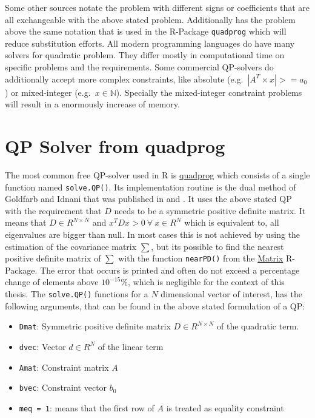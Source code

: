\documentclass[
  oneside]{book}
\providecommand{\tightlist}{%
  \setlength{\itemsep}{0pt}\setlength{\parskip}{0pt}}
\begin{document}
Some other sources notate the problem with different signs or coefficients that are all exchangeable with the above stated problem. Additionally has the problem above the same notation that is used in the R-Package \texttt{quadprog} which will reduce substitution efforts. All modern programming languages do have many solvers for quadratic problem. They differ mostly in computational time on specific problems and the requirements. Some commercial QP-solvers do additionally accept more complex constraints, like absolute (e.g.~\(|A^T \times x| >= a_0\)) or mixed-integer (e.g.~\(x \in \mathbb{N}\)). Specially the mixed-integer constraint problems will result in a enormously increase of memory.

\hypertarget{qp-solver-from-quadprog}{%
\section{QP Solver from quadprog}\label{qp-solver-from-quadprog}}

The most common free QP-solver used in R is \href{https://cran.r-project.org/web/packages/quadprog/quadprog.pdf}{quadprog} which consists of a single function named \texttt{solve.QP()}. Its implementation routine is the dual method of Goldfarb and Idnani that was published in \citep{GoId1982} and \citep{GoId1983}. It uses the above stated QP with the requirement that \(D\) needs to be a symmetric positive definite matrix. It means that \(D\in R^{N \times N}\) and \(x^T D x > 0 \ \forall \ x \in R^N\) which is equivalent to, all eigenvalues are bigger than null. In most cases this is not achieved by using the estimation of the covariance matrix \(\sum\), but its possible to find the nearest positive definite matrix of \(\textstyle\sum\) with the function \texttt{nearPD()} from the \href{https://cran.r-project.org/web/packages/Matrix/Matrix.pdf}{Matrix} R-Package. The error that occurs is printed and often do not exceed a percentage change of elements above \(10^{-15} \%\), which is negligible for the context of this thesis. The \texttt{solve.QP()} functions for a \(N\) dimensional vector of interest, has the following arguments, that can be found in the above stated formulation of a QP:

\begin{itemize}
\tightlist
\item
  \texttt{Dmat}: Symmetric positive definite matrix \(D \in R^{N \times N}\) of the quadratic term.
\item
  \texttt{dvec}: Vector \(d \in R^{N}\) of the linear term
\item
  \texttt{Amat}: Constraint matrix \(A\)
\item
  \texttt{bvec}: Constraint vector \(b_0\)
\item
  \texttt{meq\ =\ 1}: means that the first row of \(A\) is treated as equality constraint
\end{itemize}
\end{document}
